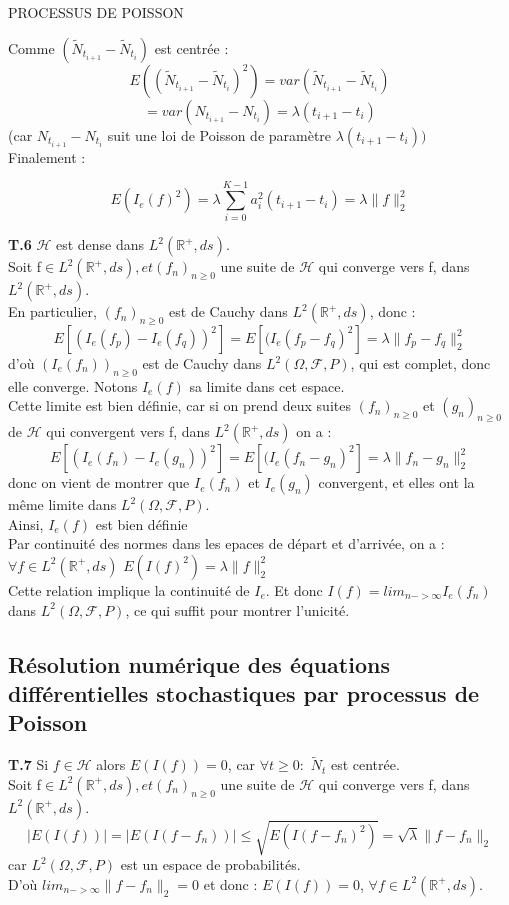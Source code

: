 PROCESSUS DE POISSON\documentclass[a4paper,10pt]{article}
\begin{document}
Comme $(\tilde{N}_{t_{i+1}}-\tilde{N}_{t_i})$ est centrée :  
$$E((\tilde{N}_{t_{i+1}}-\tilde{N}_{t_i})^2)=var(\tilde{N}_{t_{i+1}}-\tilde{N}_{t_i})$$
$$=var(N_{t_{i+1}}-N_{t_i})=\lambda(t_{i+1}-{t_i})$$
(car ${N}_{t_{i+1}}-{N}_{t_i} $ suit une loi de Poisson de param\`etre $\lambda(t_{i+1}-{t_i})) $\\

Finalement : 

$$E(I_e(f)^2)=\lambda \sum_{i=0}^{K-1}a_i^2(t_{i+1}-{t_i})=\lambda \|f\|_2^2$$

\textbf{T.6}  
 $\mathcal{H}$ est dense dans $L^2(\mathbb{R}^+,ds)$.\\

 Soit f$\in L^2(\mathbb{R}^+,ds), et  (f_n)_{n\ge 0}$ une suite de $\mathcal{H}$ qui converge vers f, dans $L^2(\mathbb{R}^+,ds)$.\\
En particulier, $ (f_n)_{n\ge 0}$ est de Cauchy dans $L^2(\mathbb{R}^+,ds)$, donc :
 $$E[(I_e(f_p)-I_e(f_q))^2]=E[(I_e(f_p-f_q)^2]=\lambda\|f_p-f_q\|_2^2$$
d'où $(I_e(f_n))_{n \ge 0}$ est de Cauchy dans $L^2(\Omega,\mathcal{F},P)$, qui est complet, donc elle converge. Notons $I_e(f) $ sa limite dans cet espace.\\
 Cette limite est bien d\'efinie, car si on prend deux suites $ (f_n)_{n\ge 0}$ et $ (g_n)_{n\ge 0}$ de $\mathcal{H}$ qui convergent vers f, dans $L^2(\mathbb{R}^+,ds)$ on a :
 $$E[(I_e(f_n)-I_e(g_n))^2]=E[(I_e(f_n-g_n)^2]=\lambda\|f_n-g_n\|_2^2$$
 donc on vient de montrer que $I_e(f_n)$ et $I_e(g_n)$ convergent, et elles ont la m\^eme limite dans $L^2(\Omega,\mathcal{F},P)$.\\
Ainsi, $I_e(f)$ est bien d\'efinie\\

 Par continuit\'e des normes dans les epaces de d\'epart et d'arriv\'ee, on a :\\
 $\forall f \in L^2(\mathbb{R}^+,ds)$  $E(I(f)^2)=\lambda \|f\|_2^2$\\
 Cette relation implique la continuit\'e de $I_e$. Et donc $I(f)= lim _{n->\infty} I_e(f_n)$ dans $L^2(\Omega,\mathcal{F},P)$, ce qui suffit pour montrer l'unicit\'e.
 \subsection[Equations différentielles stochastiques]{Résolution numérique des équations différentielles stochastiques par processus de Poisson}
\textbf{T.7}
 Si $f\in \mathcal{H}$ alors $ E(I(f))=0$, car $\forall t \ge 0 : $  $\tilde{N}_t$ est centr\'ee.\\
 Soit f$\in L^2(\mathbb{R}^+,ds), et (f_n)_{n\ge 0}$ une suite de $\mathcal{H}$ qui converge vers f, dans $L^2(\mathbb{R}^+,ds)$.
 $$|E(I(f))|=|E(I(f-f_n))| \le \sqrt{E(I(f-f_n)^2)}=\sqrt{\lambda} \|f-f_n\|_2$$ car  $L^2(\Omega,\mathcal{F},P)$ est un espace de probabilit\'es.\\
 D'où $lim_{n->\infty}\|f-f_n\|_2=0$ et donc : $E(I(f))=0$, $\forall f \in L^2(\mathbb{R}^+,ds)$.
\end{document}
